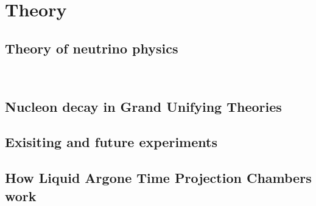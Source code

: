 
\chapter{Theory}  %

\graphicspath{{Theory/Figs/Raster/}{Theory/Figs/PDF/}{Theory/Figs/Vector/}}

\section{Theory of neutrino physics} ~\label{sec:NeutPhys}  %


\section{Nucleon decay in Grand Unifying Theories}  %

\section{Exisiting and future experiments} %

\section{How Liquid Argone Time Projection Chambers work} %
